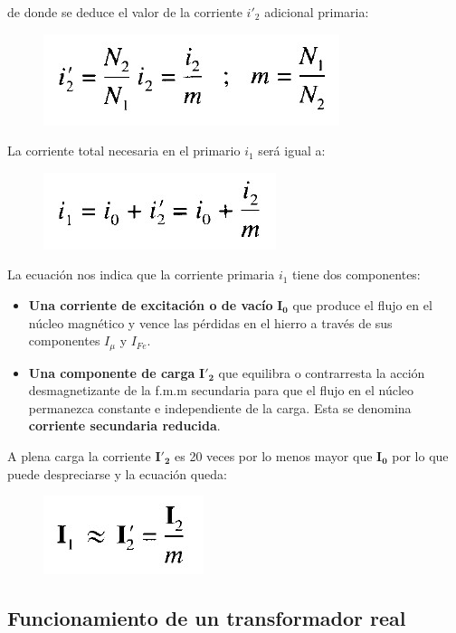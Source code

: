 de donde se deduce el valor de la corriente $i'_{2}$ adicional primaria:

 \begin{figure}[H]
	\centering
	\includegraphics[width=0.30\linewidth]{"../Figuras/10"}
\end{figure} 

La corriente total necesaria en el primario $i_{1}$ será igual a:

 \begin{figure}[H]
	\centering
	\includegraphics[width=0.30\linewidth]{"../Figuras/11"}
\end{figure} 

La ecuación nos indica que la corriente primaria $i_{1}$ tiene dos componentes:

\begin{itemize}
	\item \textbf{Una corriente de excitación o de vacío} $\mathbf{I_{0}}$ que produce el flujo en el núcleo magnético y vence las pérdidas en el hierro a través de sus componentes $I_{\mu}$ y $I_{Fe}$.
	\item \textbf{Una componente de carga} $\mathbf{I'_{2}}$ que equilibra o contrarresta la acción desmagnetizante de la f.m.m secundaria para que el flujo en el núcleo permanezca constante e independiente de la carga. Esta se denomina \textbf{corriente secundaria reducida}.
\end{itemize}

A plena carga la corriente $\mathbf{I'_{2}}$ es 20 veces por lo menos mayor que $\mathbf{I_{0}}$ por lo que puede despreciarse y la ecuación queda:

 \begin{figure}[H]
	\centering
	\includegraphics[width=0.15\linewidth]{"../Figuras/12"}
\end{figure} 

\subsection{Funcionamiento de un transformador real}

